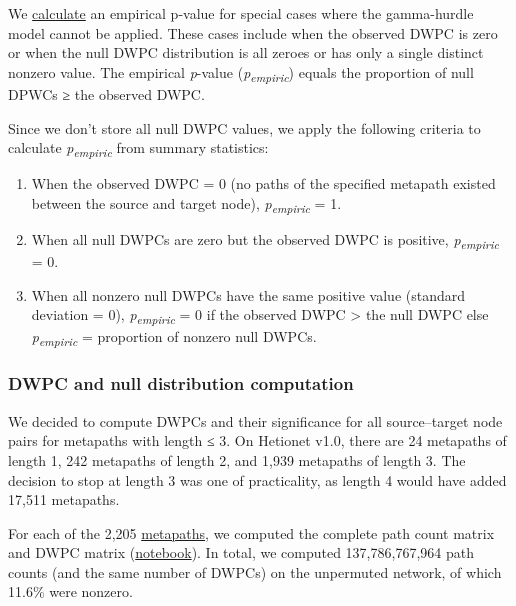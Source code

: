 We \href{https://github.com/hetio/hetmatpy/blob/bc36aa9859c43a1a5fb22808cd6eb952ef9d497c/hetmatpy/pipeline.py\#L92-L113}{calculate} an empirical p-value for special cases where the gamma-hurdle model cannot be applied.
These cases include when the observed DWPC is zero or when the null DWPC distribution is all zeroes or has only a single distinct nonzero value.
The empirical \emph{p}-value (\emph{p\textsubscript{empiric}}) equals the proportion of null DPWCs ≥ the observed DWPC.

Since we don't store all null DWPC values,
we apply the following criteria to calculate \emph{p\textsubscript{empiric}} from summary statistics:

\begin{enumerate}
\def\labelenumi{\arabic{enumi}.}
\tightlist
\item
  When the observed DWPC = 0 (no paths of the specified metapath existed between the source and target node),
  \emph{p\textsubscript{empiric}} = 1.
\item
  When all null DWPCs are zero but the observed DWPC is positive,
  \emph{p\textsubscript{empiric}} = 0.
\item
  When all nonzero null DWPCs have the same positive value (standard deviation = 0),
  \emph{p\textsubscript{empiric}} = 0 if the observed DWPC \textgreater{} the null DWPC else \emph{p\textsubscript{empiric}} = proportion of nonzero null DWPCs.
\end{enumerate}

\hypertarget{dwpc-and-null-distribution-computation}{%
\subsubsection{DWPC and null distribution computation}\label{dwpc-and-null-distribution-computation}}

We decided to compute DWPCs and their significance for all source--target node pairs for metapaths with length ≤ 3.
On Hetionet v1.0, there are 24 metapaths of length 1, 242 metapaths of length 2, and 1,939 metapaths of length 3.
The decision to stop at length 3 was one of practicality, as length 4 would have added 17,511 metapaths.

For each of the 2,205 \href{https://github.com/greenelab/connectivity-search-analyses/raw/042063fb559048e52b3dc2731b6d6c6836f698cf/explore/bulk-pipeline/archives/metapath-dwpc-stats.tsv}{metapaths},
we computed the complete path count matrix and DWPC matrix
(\href{https://github.com/greenelab/connectivity-search-analyses/blob/1c6827ce2544c17cef42bbccf098a312f2c44f97/explore/bulk-pipeline/bulk.ipynb}{notebook}).
In total, we computed 137,786,767,964 path counts (and the same number of DWPCs) on the unpermuted network,
of which 11.6\% were nonzero.

